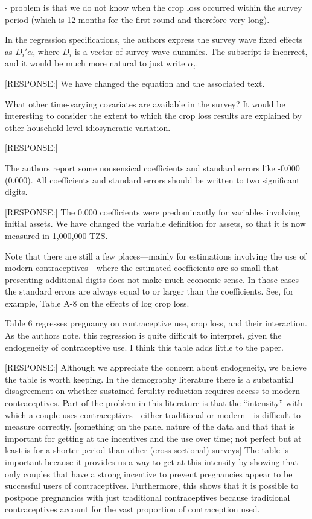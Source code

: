 \documentclass[letterpaper,12pt]{article}
\begin{document}
\begin{description}
- problem is that we do not know when the crop loss occurred within
the survey period (which is 12 months for the first round and therefore
very long).

\item In the regression specifications, the authors express the survey
wave fixed effects as $D_{i}'\alpha$, where $D_{i}$ is a vector of survey
wave dummies. The subscript is incorrect, and it would be much more
natural to just write $\alpha_{t}$.

[RESPONSE:] We have changed the equation and the associated text.

\item What other time-varying covariates are available in the survey? It
would be interesting to consider the extent to which the crop loss
results are explained by other household-level idiosyncratic variation.

[RESPONSE:]

\item The authors report some nonsensical coefficients and standard
errors like -0.000 (0.000). All coefficients and standard errors should
be written to two significant digits.

[RESPONSE:] The 0.000 coefficients were predominantly for variables
involving initial assets. 
We have changed the variable definition for assets, so that it is
now measured in 1,000,000 TZS. 

Note that there are still a few places---mainly for estimations
involving the use of modern contraceptives---where the estimated 
coefficients are so small that presenting additional digits does not make
much economic sense.
In those cases the standard errors are always equal to or larger than
the coefficients.
See, for example, Table A-8 on the effects of log crop loss.


\item Table 6 regresses pregnancy on contraceptive use, crop loss, and
their interaction. As the authors note, this regression is quite
difficult to interpret, given the endogeneity of contraceptive use. I
think this table adds little to the paper.

[RESPONSE:] Although we appreciate the concern about endogeneity, 
we believe the table is worth keeping. 
In the demography literature there is a substantial disagreement on whether
sustained fertility reduction requires access to modern contraceptives.
Part of the problem in this literature is that the ``intensity'' with
which a couple uses contraceptives---either traditional or modern---is
difficult to measure correctly.
[something on the panel nature of the data and that that is important
for getting at the incentives and the use over time; not perfect but
at least is for a shorter period than other (cross-sectional) surveys]
The table is important because it provides us a way to get at this
intensity by showing that only couples that have a strong incentive to
prevent pregnancies appear to be successful users of contraceptives.
Furthermore, this shows that it is possible to postpone pregnancies with
just traditional contraceptives because traditional contraceptives account 
for the vast proportion of contraception used.


\end{description}
\end{document}
